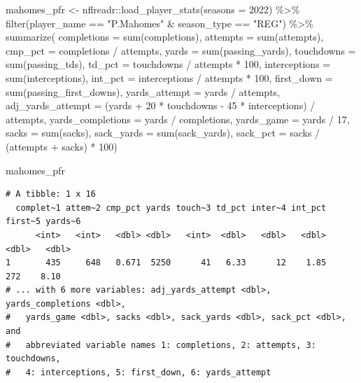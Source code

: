 \documentclass[
  letterpaper,
]{krantz}
\newenvironment{Shaded}{\begin{snugshade}}{\end{snugshade}}
\newcommand{\AttributeTok}[1]{\textcolor[rgb]{0.40,0.45,0.13}{#1}}
\newcommand{\DecValTok}[1]{\textcolor[rgb]{0.68,0.00,0.00}{#1}}
\newcommand{\FunctionTok}[1]{\textcolor[rgb]{0.28,0.35,0.67}{#1}}
\newcommand{\NormalTok}[1]{\textcolor[rgb]{0.00,0.23,0.31}{#1}}
\newcommand{\OtherTok}[1]{\textcolor[rgb]{0.00,0.23,0.31}{#1}}
\newcommand{\SpecialCharTok}[1]{\textcolor[rgb]{0.37,0.37,0.37}{#1}}
\newcommand{\StringTok}[1]{\textcolor[rgb]{0.13,0.47,0.30}{#1}}
\begin{document}
\begin{Shaded}
\begin{Highlighting}[]
\NormalTok{mahomes\_pfr }\OtherTok{\textless{}{-}}\NormalTok{ nflreadr}\SpecialCharTok{::}\FunctionTok{load\_player\_stats}\NormalTok{(}\AttributeTok{seasons =} \DecValTok{2022}\NormalTok{) }\SpecialCharTok{\%\textgreater{}\%}
  \FunctionTok{filter}\NormalTok{(player\_name }\SpecialCharTok{==} \StringTok{"P.Mahomes"} \SpecialCharTok{\&}\NormalTok{ season\_type }\SpecialCharTok{==} \StringTok{"REG"}\NormalTok{) }\SpecialCharTok{\%\textgreater{}\%}
  \FunctionTok{summarize}\NormalTok{(}
    \AttributeTok{completions =} \FunctionTok{sum}\NormalTok{(completions),}
    \AttributeTok{attempts =} \FunctionTok{sum}\NormalTok{(attempts),}
    \AttributeTok{cmp\_pct =}\NormalTok{ completions }\SpecialCharTok{/}\NormalTok{ attempts,}
    \AttributeTok{yards =} \FunctionTok{sum}\NormalTok{(passing\_yards),}
    \AttributeTok{touchdowns =} \FunctionTok{sum}\NormalTok{(passing\_tds),}
    \AttributeTok{td\_pct =}\NormalTok{ touchdowns }\SpecialCharTok{/}\NormalTok{ attempts }\SpecialCharTok{*} \DecValTok{100}\NormalTok{,}
    \AttributeTok{interceptions =} \FunctionTok{sum}\NormalTok{(interceptions),}
    \AttributeTok{int\_pct =}\NormalTok{ interceptions }\SpecialCharTok{/}\NormalTok{ attempts }\SpecialCharTok{*} \DecValTok{100}\NormalTok{,}
    \AttributeTok{first\_down =} \FunctionTok{sum}\NormalTok{(passing\_first\_downs),}
    \AttributeTok{yards\_attempt =}\NormalTok{ yards }\SpecialCharTok{/}\NormalTok{ attempts,}
    \AttributeTok{adj\_yards\_attempt =}\NormalTok{ (yards }\SpecialCharTok{+} \DecValTok{20} \SpecialCharTok{*}\NormalTok{ touchdowns }\SpecialCharTok{{-}} \DecValTok{45} \SpecialCharTok{*}\NormalTok{ interceptions) }\SpecialCharTok{/}\NormalTok{ attempts,}
    \AttributeTok{yards\_completions =}\NormalTok{ yards }\SpecialCharTok{/}\NormalTok{ completions,}
    \AttributeTok{yards\_game =}\NormalTok{ yards }\SpecialCharTok{/} \DecValTok{17}\NormalTok{,}
    \AttributeTok{sacks =} \FunctionTok{sum}\NormalTok{(sacks),}
    \AttributeTok{sack\_yards =} \FunctionTok{sum}\NormalTok{(sack\_yards),}
    \AttributeTok{sack\_pct =}\NormalTok{ sacks }\SpecialCharTok{/}\NormalTok{ (attempts }\SpecialCharTok{+}\NormalTok{ sacks) }\SpecialCharTok{*} \DecValTok{100}\NormalTok{)}

\NormalTok{mahomes\_pfr}
\end{Highlighting}
\end{Shaded}

\begin{verbatim}
# A tibble: 1 x 16
  complet~1 attem~2 cmp_pct yards touch~3 td_pct inter~4 int_pct first~5 yards~6
      <int>   <int>   <dbl> <dbl>   <int>  <dbl>   <dbl>   <dbl>   <dbl>   <dbl>
1       435     648   0.671  5250      41   6.33      12    1.85     272    8.10
# ... with 6 more variables: adj_yards_attempt <dbl>, yards_completions <dbl>,
#   yards_game <dbl>, sacks <dbl>, sack_yards <dbl>, sack_pct <dbl>, and
#   abbreviated variable names 1: completions, 2: attempts, 3: touchdowns,
#   4: interceptions, 5: first_down, 6: yards_attempt
\end{verbatim}
\end{document}
